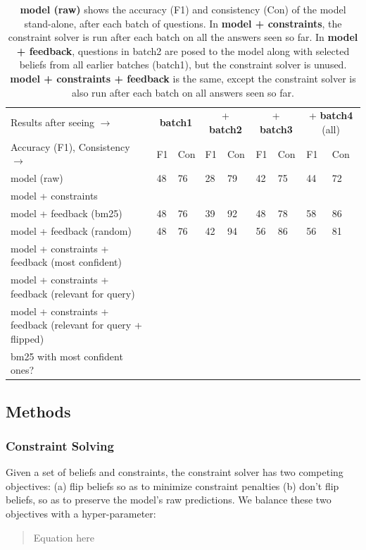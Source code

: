 \documentclass[11pt]{article}
\begin{document}
\begin{table}
\centering
{\small
\begin{tabular}{|l|ll|ll|ll|ll|} \hline
Results after seeing $\rightarrow$ & \multicolumn{2}{|c|}{\bf batch1} &
\multicolumn{2}{|c|}{+ {\bf batch2}} &
\multicolumn{2}{|c|}{+ {\bf batch3}} &
\multicolumn{2}{|c|}{+ {\bf batch4} (all)} \\
Accuracy (F1), Consistency $\rightarrow$ & F1 & Con & F1 & Con & F1 & Con & F1 & Con \\ \hline           
model (raw) & 48 & 76 & 28 & 79 & 42 & 75 & 44 & 72\\
model + constraints & & & & & & & & \\
model + feedback (bm25) & 48 & 76 & 39 & 92 & 48 & 78 & 58 & 86\\
model + feedback (random) & 48 & 76 & 42 & 94 & 56 & 86 & 56 & 81\\
model + constraints + feedback (most confident) & & & & & & & & \\
model + constraints + feedback (relevant for query) & & & & & & & & \\
model + constraints + feedback (relevant for query + flipped) & & & & & & & & \\\hline
bm25 with most confident ones?\\
\end{tabular}
}
\caption{{\bf model (raw)} shows the accuracy (F1) and consistency (Con) of the
model stand-alone, after each batch of questions. 
 In {\bf model + constraints}, the constraint solver is run
 after each batch on all the answers seen so far. In {\bf model + feedback},
 questions in batch2 are posed to the model along with selected beliefs from
 all earlier batches (batch1), but the constraint solver is unused. 
 {\bf model + constraints + feedback} is the same, except the constraint solver is also run
 after each batch on all answers seen so far.
\label{incremental-improvement}}
\end{table}

\subsection{Methods}

\subsubsection{Constraint Solving}

Given a set of beliefs and constraints, the constraint solver has two competing objectives: (a) flip 
beliefs so as to minimize constraint penalties (b) don't flip beliefs, so as to preserve
the model's raw predictions. We balance these two objectives with a hyper-parameter:
\begin{quote}
    Equation here
\end{quote}
\end{document}
